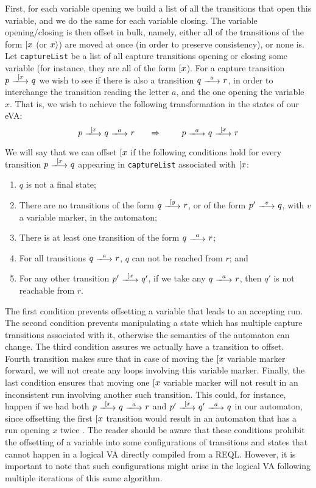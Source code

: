 First, for each variable opening we build a list of all the transitions that
open this variable, and we do the same for each variable closing. The variable
opening/closing is then offset in bulk, namely, either all of the transitions of
the form $[ x$ (or $x \rangle$) are moved at once (in order to preserve
consistency), or none is. Let \texttt{captureList} be a list of all capture
transitions opening or closing some variable (for instance, they are all of the
form $[ x$). For a capture transition $p\ \longtrans{\Open{x}}\ q$ we wish
to see if there is also a transition $q\ \longtrans{a}\ r$, in order to
interchange the transition reading the letter $a$, and the one opening the
variable $x$. That is, we wish to achieve the following transformation in the
states of our eVA:
$$p\ \longtrans{\Open{x}}\ q\ \longtrans{a}\ r \ \ \ \ \ \Rightarrow \ \ \ \ \ \
\ p\ \longtrans{a}\ q\ \longtrans{\Open{x}}\ r$$


We will say that we can offset $[ x$ if the following conditions hold for
every transition $p\ \longtrans{\Open{x}}\ q$ appearing in \texttt{captureList}
associated with $[ x$:
\begin{enumerate}
	\item $q$ is not a final state;
	\item There are no transitions of the form $q\ \longtrans{\Open{y}}\ r$, or
	of the form $p'\ \longtrans{v}\ q$, with $v$ a variable marker, in the
	automaton; \label{item:offset-cond-2}
	\item There is at least one transition of the form $q\ \longtrans{a}\ r$;
	\item For all transitions $q\ \longtrans{a}\ r$, $q$ can not be reached from
	$r$; and
	\item For any other transition $p'\ \longtrans{\Open{x}}\ q'$, if we take
	any $q\ \longtrans{a}\ r$, then $q'$ is not reachable from $r$.
\end{enumerate}

The first condition prevents offsetting a variable that leads to an accepting
run. The second condition prevents manipulating a state which has multiple
capture transitions associated with it, otherwise the semantics of the automaton
can change. The third condition assures we actually have a transition to offset.
Fourth transition makes sure that in case of moving the $[ x$ variable
marker forward, we will not create any loops involving this variable marker.
Finally, the last condition ensures that moving one $[ x$ variable marker
will not result in an inconsistent run involving another such transition. This
could, for instance, happen if we had both $p\ \longtrans{\Open{x}}\ q\
\longtrans{a}\ r$ and $p'\ \longtrans{\Open{x}}\ q'\ \longtrans{a}\ q$ in our
automaton, since offsetting the first $[ x$ transition would result in an
automaton that has a run opening $x$ twice . The reader should be aware that
these conditions prohibit the offsetting of a variable into some configurations
of transitions and states that cannot happen in a logical VA directly compiled
from a REQL. However, it is important to note that such configurations might
arise in the logical VA following multiple iterations of this same algorithm.


